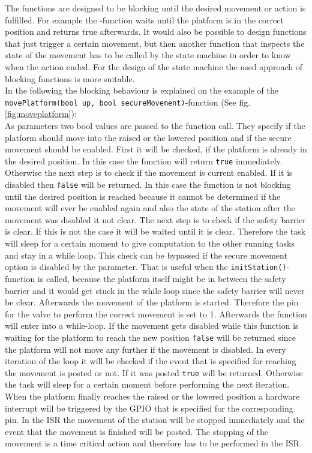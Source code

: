 The functions are designed to be blocking until the desired movement or action is fulfilled. For example the -function waits until the platform is in the correct position and returns true afterwards. It would also be possible to design functions that just trigger a certain movement, but then another function that inspects the state of the movement has to be called by the state machine in order to know when the action ended. For the design of the state machine the used approach of blocking functions is more suitable. \\

In the following the blocking behaviour is explained on the example of the \texttt{movePlatform(bool up, bool secureMovement)}-function (See fig. \ref{fig:moveplatform}): \\
As parameters two bool values are passed to the function call. They specify if the platform should move into the raised or the lowered position and if the secure movement should be enabled. 
First it will be checked, if the platform is already in the desired position. In this case the function will return \texttt{true} immediately. Otherwise the next step is to check if the movement is current enabled. If it is disabled then \texttt{false} will be returned. In this case the function is not blocking until the desired position is reached because it cannot be determined if the movement will ever be enabled again and also the state of the station after the movement was disabled it not clear.
The next step is to check if the safety barrier is clear. If this is not the case it will be waited until it is clear. Therefore the task will sleep for a certain moment to give computation to the other running tasks and stay in a while loop. This check can be bypassed if the secure movement option is disabled by the parameter. That is useful when the \texttt{initStation()}-function is called, because the platform itself might be in between the safety barrier and it would get stuck in the while loop since the safety barrier will never be clear.
Afterwards the movement of the platform is started. Therefore the pin for the valve to perform the correct movement is set to 1. 
Afterwards the function will enter into a while-loop. If the movement gets disabled while this function is waiting for the platform to reach the new position \texttt{false} will be returned since the platform will not move any further if the movement is disabled. In every iteration of the loop it will be checked if the event that is specified for reaching the movement is posted or not. If it was posted \texttt{true} will be returned. Otherwise the task will sleep for a certain moment before performing the next iteration.\\
When the platform finally reaches the raised or the lowered position a hardware interrupt will be triggered by the GPIO that is specified for the corresponding pin. %
In the ISR the movement of the station will be stopped immediately and the event that the movement is finished will be posted. The stopping of the movement is a time critical action and therefore has to be performed in the ISR. 


